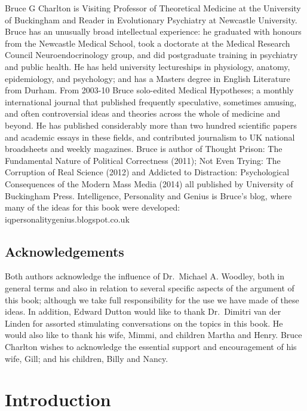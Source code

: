 \documentclass[
]{book}
\begin{document}
Bruce G Charlton is Visiting Professor of Theoretical Medicine at the University of Buckingham and Reader in Evolutionary Psychiatry at Newcastle University. Bruce has an unusually broad intellectual experience: he graduated with honours from the Newcastle Medical School, took a doctorate at the Medical Research Council Neuroendocrinology group, and did postgraduate training in psychiatry and public health. He has held university lectureships in physiology, anatomy, epidemiology, and psychology; and has a Masters degree in English Literature from Durham. From 2003-10 Bruce solo-edited Medical Hypotheses; a monthly international journal that published frequently speculative, sometimes amusing, and often controversial ideas and theories across the whole of medicine and beyond. He has published considerably more than two hundred scientific papers and academic essays in these fields, and contributed journalism to UK national broadsheets and weekly magazines. Bruce is author of Thought Prison: The Fundamental Nature of Political Correctness (2011); Not Even Trying: The Corruption of Real Science (2012) and Addicted to Distraction: Psychological Consequences of the Modern Mass Media (2014) all published by University of Buckingham Press. Intelligence, Personality and Genius is Bruce's blog, where many of the ideas for this book were developed: iqpersonalitygenius.blogspot.co.uk

\hypertarget{acknowledgements}{%
\section*{Acknowledgements}\label{acknowledgements}}

Both authors acknowledge the influence of Dr.~Michael A. Woodley, both in general terms and also in relation to several specific aspects of the argument of this book; although we take full responsibility for the use we have made of these ideas. In addition, Edward Dutton would like to thank Dr.~Dimitri van der Linden for assorted stimulating conversations on the topics in this book. He would also like to thank his wife, Mimmi, and children Martha and Henry. Bruce Charlton wishes to acknowledge the essential support and encouragement of his wife, Gill; and his children, Billy and Nancy.

\hypertarget{introduction}{%
\chapter*{Introduction}\label{introduction}}
\end{document}

